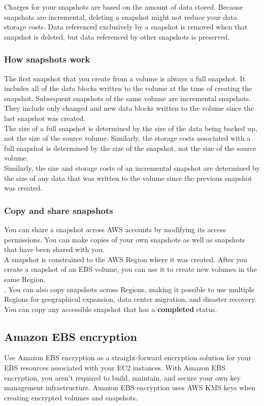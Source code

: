 \documentclass[12pt, letterpaper, twoside]{article}
\begin{document}
Charges for your snapshots are based on the amount of data stored. Because snapshots are incremental, deleting a snapshot might not reduce 
your data storage costs. Data referenced exclusively by a snapshot is removed when that snapshot is deleted, but data referenced by other 
snapshots is preserved.

\subsubsection{How snapshots work}
The first snapshot that you create from a volume is always a full snapshot. It includes all of the data blocks written to the volume at the 
time of creating the snapshot. Subsequent snapshots of the same volume are incremental snapshots. They include only changed and new data 
blocks written to the volume since the last snapshot was created.\\

The size of a full snapshot is determined by the size of the data being backed up, not the size of the source volume. Similarly, the storage 
costs associated with a full snapshot is determined by the size of the snapshot, not the size of the source volume.\\
Similarly, the size and storage costs of an incremental snapshot are determined by the size of any data that was written to the volume since 
the previous snapshot was created.\\

\subsubsection{Copy and share snapshots}
You can share a snapshot across AWS accounts by modifying its access permissions. You can make copies of your own snapshots as well as 
snapshots that have been shared with you.\\
A snapshot is constrained to the AWS Region where it was created. After you create a snapshot of an EBS volume, you can use it to create new 
volumes in the same Region.\\
. You can also copy snapshots across Regions, making it possible to use multiple Regions for geographical expansion, data center migration, 
and disaster recovery. You can copy any accessible snapshot that has a \textbf{completed} status.

\subsection{Amazon EBS encryption}
Use Amazon EBS encryption as a straight-forward encryption solution for your EBS resources associated with your EC2 instances. With Amazon 
EBS encryption, you aren't required to build, maintain, and secure your own key management infrastructure. Amazon EBS encryption uses AWS KMS 
keys when creating encrypted volumes and snapshots.\\
\end{document}
